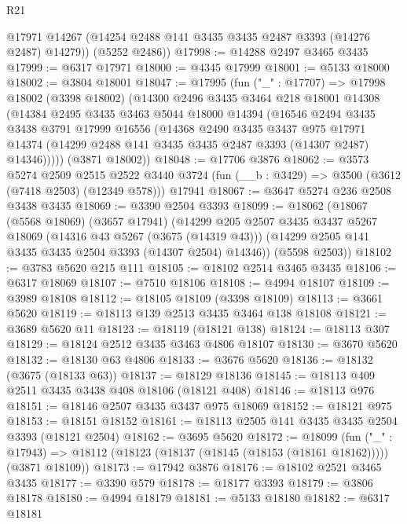 \begin{lexlean}{R21}
\begin{coremodule}
        @17971
        @14267
        (@14254 @2488 @141 @3435 @3435 @2487 @3393 (@14276 @2487) @14279))
      (@5252 @2486))
@17998 := @14288 @2497 @3465 @3435
@17999 := @6317 @17971
@18000 := @4345 @17999
@18001 := @5133 @18000
@18002 := @3804 @18001
@18047 := @17995
    (fun ("_" : @17707) =>
    @17998
      @18002
      (@3398 @18002)
      (@14300
        @2496
        @3435
        @3464
        @218
        @18001
        @14308
        (@14384
          @2495
          @3435
          @3463
          @5044
          @18000
          @14394
          (@16546
            @2494
            @3435
            @3438
            @3791
            @17999
            @16556
            (@14368
              @2490
              @3435
              @3437
              @975
              @17971
              @14374
              (@14299 @2488 @141 @3435 @3435 @2487 @3393 (@14307 @2487) @14346)))))
      (@3871 @18002))
@18048 := @17706 @3876
@18062 := @3573
    @5274
    @2509
    @2515
    @2522
    @3440
    @3724
    (fun (__b : @3429) => @3500 (@3612 (@7418 @2503) (@12349 @578)))
    @17941
@18067 := @3647 @5274 @236 @2508 @3438 @3435
@18069 := @3390 @2504 @3393
@18099 := @18062
    (@18067
      (@5568 @18069)
      (@3657 @17941)
      (@14299
        @205
        @2507
        @3435
        @3437
        @5267
        @18069
        (@14316 @43 @5267 (@3675 (@14319 @43)))
        (@14299 @2505 @141 @3435 @3435 @2504 @3393 (@14307 @2504) @14346))
      (@5598 @2503))
@18102 := @3783 @5620 @215 @111
@18105 := @18102 @2514 @3465 @3435
@18106 := @6317 @18069
@18107 := @7510 @18106
@18108 := @4994 @18107
@18109 := @3989 @18108
@18112 := @18105 @18109 (@3398 @18109)
@18113 := @3661 @5620
@18119 := @18113 @139 @2513 @3435 @3464 @138 @18108
@18121 := @3689 @5620 @11
@18123 := @18119 (@18121 @138)
@18124 := @18113 @307
@18129 := @18124 @2512 @3435 @3463 @4806 @18107
@18130 := @3670 @5620
@18132 := @18130 @63 @4806
@18133 := @3676 @5620
@18136 := @18132 (@3675 (@18133 @63))
@18137 := @18129 @18136
@18145 := @18113 @409 @2511 @3435 @3438 @408 @18106 (@18121 @408)
@18146 := @18113 @976
@18151 := @18146 @2507 @3435 @3437 @975 @18069
@18152 := @18121 @975
@18153 := @18151 @18152
@18161 := @18113 @2505 @141 @3435 @3435 @2504 @3393 (@18121 @2504)
@18162 := @3695 @5620
@18172 := @18099
    (fun ("_" : @17943) =>
    @18112 (@18123 (@18137 (@18145 (@18153 (@18161 @18162))))) (@3871 @18109))
@18173 := @17942 @3876
@18176 := @18102 @2521 @3465 @3435
@18177 := @3390 @579
@18178 := @18177 @3393
@18179 := @3806 @18178
@18180 := @4994 @18179
@18181 := @5133 @18180
@18182 := @6317 @18181

\end{coremodule}
\end{lexlean}
